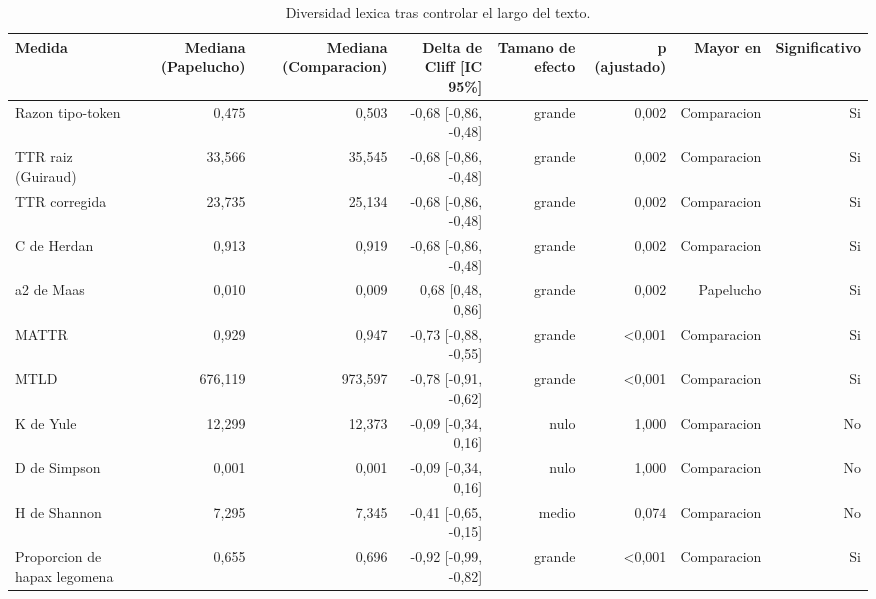 \begin{table}[htbp]
\centering
\small
\caption{Diversidad lexica tras controlar el largo del texto.}
\label{tab:lexical-controlled-es}
\begin{tabular}{lrrrrrrr}
\toprule
\textbf{Medida} & \textbf{Mediana (Papelucho)} & \textbf{Mediana (Comparacion)} & \textbf{Delta de Cliff [IC 95\%]} & \textbf{Tamano de efecto} & \textbf{p (ajustado)} & \textbf{Mayor en} & \textbf{Significativo} \\
\midrule
Razon tipo-token & 0,475 & 0,503 & -0,68 [-0,86, -0,48] & grande & 0,002 & Comparacion & Si \\
TTR raiz (Guiraud) & 33,566 & 35,545 & -0,68 [-0,86, -0,48] & grande & 0,002 & Comparacion & Si \\
TTR corregida & 23,735 & 25,134 & -0,68 [-0,86, -0,48] & grande & 0,002 & Comparacion & Si \\
C de Herdan & 0,913 & 0,919 & -0,68 [-0,86, -0,48] & grande & 0,002 & Comparacion & Si \\
a2 de Maas & 0,010 & 0,009 & 0,68 [0,48, 0,86] & grande & 0,002 & Papelucho & Si \\
MATTR & 0,929 & 0,947 & -0,73 [-0,88, -0,55] & grande & <0,001 & Comparacion & Si \\
MTLD & 676,119 & 973,597 & -0,78 [-0,91, -0,62] & grande & <0,001 & Comparacion & Si \\
K de Yule & 12,299 & 12,373 & -0,09 [-0,34, 0,16] & nulo & 1,000 & Comparacion & No \\
D de Simpson & 0,001 & 0,001 & -0,09 [-0,34, 0,16] & nulo & 1,000 & Comparacion & No \\
H de Shannon & 7,295 & 7,345 & -0,41 [-0,65, -0,15] & medio & 0,074 & Comparacion & No \\
Proporcion de hapax legomena & 0,655 & 0,696 & -0,92 [-0,99, -0,82] & grande & <0,001 & Comparacion & Si \\
\bottomrule
\end{tabular}
\end{table}

